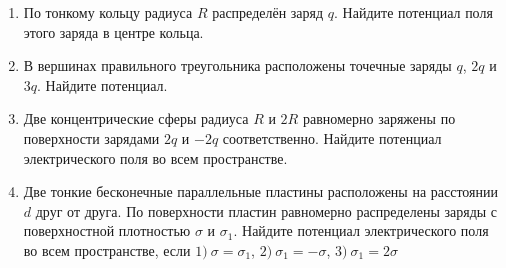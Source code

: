 \documentclass[12pt,a5paper]{article}
\begin{document}
\noindent
\begin{enumerate}
	\item По тонкому кольцу радиуса $R$ распределён заряд $q$. Найдите потенциал поля этого заряда в центре кольца.
	\item В вершинах правильного треугольника расположены точечные заряды $q$, $2q$ и $3q$. Найдите потенциал.
	\item Две концентрические сферы радиуса $R$ и $2R$ равномерно заряжены по поверхности зарядами $2q$ и $-2q$ соответственно. Найдите потенциал электрического поля во всем пространстве.
	\item Две тонкие бесконечные параллельные пластины расположены на расстоянии $d$ друг от друга. По поверхности пластин равномерно распределены заряды с поверхностной плотностью $\sigma$ и $\sigma_1$. Найдите потенциал электрического поля во всем пространстве, если $1)\ \sigma = \sigma_1$, $2)\ \sigma_1 = -\sigma$, $3)\ \sigma_1 = 2 \sigma$
\end{enumerate}
\end{document}
